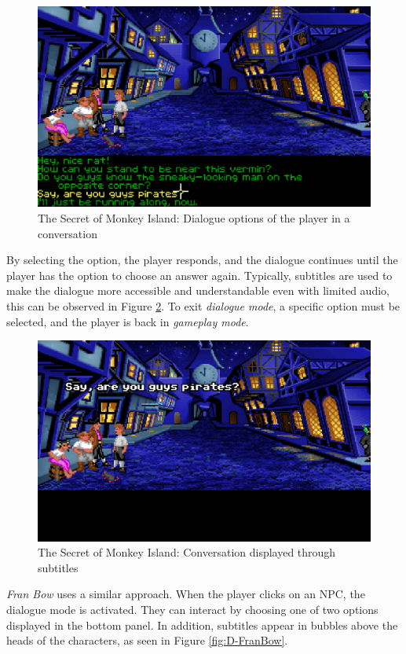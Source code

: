 \begin{figure}[H]
\centering
\includegraphics[width=.8\linewidth]{img/D-TSoMI1.png}
\caption{The Secret of Monkey Island: Dialogue options of the player in a conversation}
\label{fig:D-TSoMI1}
\end{figure}

By selecting the option, the player responds, and the dialogue continues until the player has the option to choose an answer again. Typically, subtitles are used to make the dialogue more accessible and understandable even with limited audio, this can be observed in Figure \ref{fig:D-TSoMI2}. To exit \textit{dialogue mode}, a specific option must be selected, and the player is back in \textit{gameplay mode}.

\begin{figure}[H]
\centering
\includegraphics[width=.8\linewidth]{img/D-TSoMI2.png}
\caption{The Secret of Monkey Island: Conversation displayed through subtitles}
\label{fig:D-TSoMI2}
\end{figure}

\textit{Fran Bow} uses a similar approach. When the player clicks on an NPC, the dialogue mode is activated. They can interact by choosing one of two options displayed in the bottom panel. In addition, subtitles appear in bubbles above the heads of the characters, as seen in Figure \ref{fig:D-FranBow}. 

